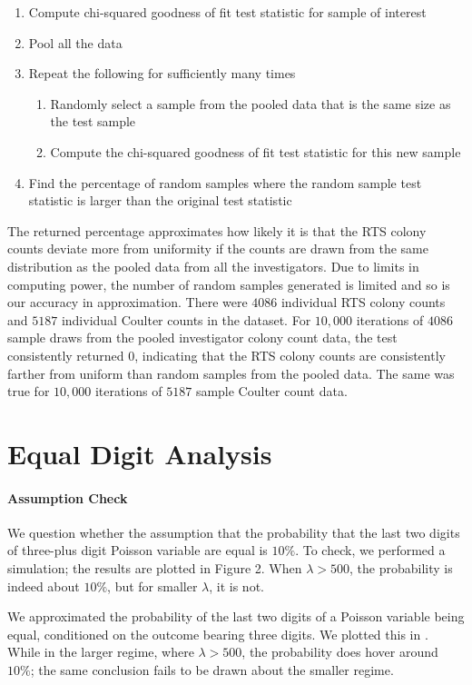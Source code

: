 \documentclass[11pt]{article}
\begin{document}
\begin{enumerate}
    \item Compute chi-squared goodness of fit test statistic for sample of interest
    \item Pool all the data
    \item Repeat the following for sufficiently many times
    \begin{enumerate}
        \item Randomly select a sample from the pooled data that is the same size as the test sample
        \item Compute the chi-squared goodness of fit test statistic for this new sample
    \end{enumerate}
    \item Find the percentage of random samples where the random sample test statistic is larger than the original test statistic
\end{enumerate}

The returned percentage approximates how likely it is that the RTS colony counts deviate more from uniformity if the counts are drawn from the same distribution as the pooled data from all the investigators. Due to limits in computing power, the number of random samples generated is limited and so is our accuracy in approximation. There were $4086$ individual RTS colony counts and $5187$ individual Coulter counts in the dataset. For $10,000$ iterations of $4086$ sample draws from the pooled investigator colony count data, the test consistently returned $0$, indicating that the RTS colony counts are consistently farther from uniform than random samples from the pooled data. The same was true for $10,000$ iterations of $5187$ sample Coulter count data.

\section{Equal Digit Analysis} 
\paragraph{Assumption Check} We question whether the assumption that the probability that the last two digits of three-plus digit Poisson variable are equal is $10\%$. To check, we performed a simulation; the results are plotted in Figure 2. When $\lambda > 500$, the probability is indeed about $10\%$, but for smaller $\lambda$, it is not.

We approximated the probability of the last two digits of a Poisson variable being equal, conditioned on the outcome bearing three digits. We plotted this in . While in the larger regime, where $\lambda > 500$, the probability does hover around $10\%$; the same conclusion fails to be drawn about the smaller regime.
\end{document}
